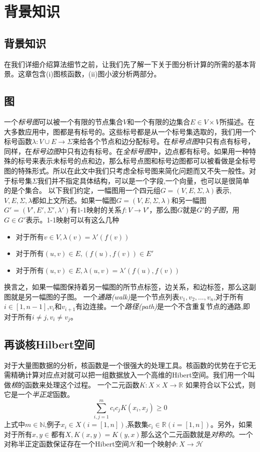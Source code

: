 \documentclass{article}
\begin{document}
\section{背景知识}
\else
\subsection{背景知识}
\fi
在我们详细介绍算法细节之前，让我们先了解一下关于图分析计算的所需的基本背景。这章包含(i)图核函数，(ii)图小波分析两部分。
\subsection{图}
一个\emph{标号图}可以被一个有限的节点集合$V$和一个有限的边集合$E\in V\times V$所描述。在大多数应用中，图都是有标号的。这些标号都是从一个标号集选取的，我们用一个标号函数$\lambda :V\cup E\rightarrow \Sigma$来给各个节点和边分配标号。在\emph{标号点图}中只有点有标号，同样，在\emph{标号边图}中只有边有标号。在\emph{全标号图}中，边点都有标号。如果用一种特殊的标号来表示未标号的点和边，那么标号点图和标号边图都可以被看做是全标号图的特殊形式。所以在此文中我们只考虑全标号图来简化问题而又不失一般性。对于标号集$\Sigma$我们并不指定具体结构，可以是一个字段,一个向量，也可以是很简单的是个集合。
以下我们约定，一幅图用一个四元组$G=(V,E,\Sigma ,\lambda )$表示,$V,E,\Sigma,\lambda$都如上文所述。如果一幅图$G=(V,E,\Sigma,\lambda)$和另一幅图$G'=(V',E',\Sigma',\lambda')$有1-1映射的关系$f:V\rightarrow V'$，那么图$G$就是$G'$的\emph{子图}，用$G\in G' $表示。1-1映射可以有这么几种
\begin{itemize}
    \item 对于所有$v\in V,\lambda(v)=\lambda '(f(v))$
    \item 对于所有$(u,v)\in E,(f(u),f(v))\in E'$
    \item 对于所有$(u,v)\in E,\lambda(u,v)=\lambda '(f(u),f(v)) $
\end{itemize}
换言之，如果一幅图保持着另一幅图的所节点标签，边关系，和边标签，那么这副图就是另一幅图的子图。
一个\emph{通路(walk)}是一个节点列表$v_1,v_2,...,v_n$,对于所有$i\in [1,n-1]$,$v_i$和$v_{i+1}$有边连接。一个\emph{路径(path)}是一个不含重复节点的通路,即对于所有$i\neq j,v_i \neq v_j$。
\subsection{再谈核Hilbert空间}
对于大量图数据的分析，核函数是一个很强大的处理工具。核函数的优势在于它无需精确计算对应点对就可以把一组数据放入一个高维的Hibert空间。我们用一个叫做\emph{核}的函数来处理这个过程。
一个二元函数$K:X\times X\rightarrow \mathbb{R}$ 如果符合以下公式，则它是一个\emph{半正定}函数。
\begin{equation}
    \sum_{i,j=1}^{m}c_i c_j K(x_i ,x_j )\geq 0
\end{equation}
上式中$m\in \mathbb{N}$,例子$x_i \in X(i=[1,n])$,系数集$c_i \in \mathbb{R}(i=[1,n])$。另外，如果$对于所有x,y\in 都有X,K(x,y)=K(y,x)$那么这个二元函数就是\emph{对称的}。一个对称半正定函数保证存在一个Hibert空间$\mathcal{H}$和一个映射$\Phi:X\rightarrow \mathcal{H} $



\ifx\allfiles\undefined
%
%
\end{document}
